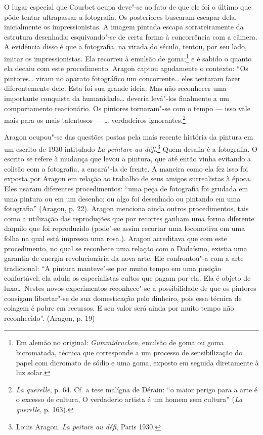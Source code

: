 O lugar especial que Courbet ocupa deve"-se ao fato de que ele foi o
último que pôde tentar ultrapassar a fotografia. Os posteriores buscaram
escapar dela, inicialmente os impressionistas. A imagem pintada escapa
sorrateiramente da estrutura desenhada; esquivando"-se de certa forma à
concorrência com a câmera. A evidência disso é que a fotografia, na
virada do século, tentou, por seu lado, imitar os impressionistas. Ela
recorreu à emulsão de goma;\footnote{Em alemão no original:
  \emph{Gummidrucken}, emulsão de goma ou goma bicromatada, técnica que
  corresponde a um processo de sensibilização do papel com dicromato de
  sódio e uma goma, exposto em seguida diretamente à luz solar. \versal{[N. T.]}} e é
sabido o quanto ela decaiu com este procedimento. Aragon captou
agudamente o contexto: ``Os pintores\ldots{} viram no aparato fotográfico um
concorrente\ldots{} eles tentaram fazer diferentemente dele. Esta foi sua
grande ideia. Mas não reconhecer uma importante conquista da humanidade\ldots{} deveria levá"-los finalmente a um comportamento reacionário. Os
pintores tornaram"-se com o tempo --- isso vale mais para os mais
talentosos --- \ldots{} verdadeiros ignorantes.\footnote{\emph{La querelle}, p.
  64. Cf. a tese malígna de Dérain: ``o maior perigo para a arte é o
  excesso de cultura, O verdaderio artista é um homem sem cultura''
  (\emph{La querelle}, p. 163).}

Aragon ocupou"-se das questões postas pela mais recente história da
pintura em um escrito de 1930 intitulado \emph{La peinture au
défi}.\footnote{Louis Aragon. \emph{La peiture au défi}, Paris 1930.}
Quem desafia é a fotografia. O escrito se refere à mudança que levou a
pintura, que até então vinha evitando a colisão com a fotografia, a
encará"-la de frente. A maneira como ela fez isso foi exposta por Aragon
em relação ao trabalho de seus amigos surrealistas à época. Eles usaram
diferentes procedimentos: ``uma peça de fotografia foi grudada em uma
pintura ou em um desenho; ou algo foi desenhado ou pintando em uma
fotografia'' (Aragon, p. 22). Aragon menciona ainda outros
procedimentos, tais como a utilização das reproduções que por recortes
ganham uma forma diferente daquilo que foi reproduzido (pode"-se assim
recortar uma locomotiva em uma folha na qual está impressa uma rosa.).
Aragon acreditava que com este procedimento, no qual se reconhece uma
relação com o Dadaísmo, existia uma garantia de energia revolucionária
da nova arte. Ele confrontou"-a com a arte tradicional: ``A pintura
manteve"-se por muito tempo em uma posição confortável; ela adula os
especialistas cultos que pagam por ela. Ela é objeto de luxo\ldots{} Nestes
novos experimentos reconhece"-se a possibilidade de que os pintores
consigam libertar"-se de sua domesticação pelo dinheiro, pois essa
técnica de colagem é pobre em recursos. E seu valor será ainda por muito
tempo não reconhecido''. (Aragon, p. 19)

